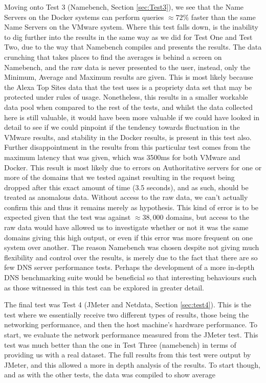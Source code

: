 Moving onto Test 3 (Namebench, Section \ref{sec:Test3}), we see that the Name Servers on the Docker systems can perform queries \(\approx72\%\) faster than the same Name Servers on the VMware system. Where this test falls down, is the inability to dig further into the results in the same way as we did for Test One and Test Two, due to the way that Namebench compiles and presents the results. The data crunching that takes places to find the averages is behind a screen on Namebench, and the raw data is never presented to the user, instead, only the Minimum, Average and Maximum results are given. This is most likely because the Alexa Top Sites data that the test uses is a propriety data set that may be protected under rules of usage. Nonetheless, this results in a smaller workable data pool when compared to the rest of the tests, and whilst the data collected here is still valuable, it would have been more valuable if we could have looked in detail to see if we could pinpoint if the tendency towards fluctuation in the VMware results, and stability in the Docker results, is present in this test also. Further disappointment in the results from this particular test comes from the maximum latency that was given, which was 3500ms for both VMware and Docker. This result is most likely due to errors on Authoritative servers for one or more of the domains that we tested against resulting in the request being dropped after this exact amount of time (3.5 seconds), and as such, should be treated as anomalous data. Without access to the raw data, we can't actually confirm this and thus it remains merely as hypothesis. This kind of error is to be expected given that the test was against \(\approx 38,000\) domains, but access to the raw data would have allowed us to investigate whether or not it was the same domains giving this high output, or even if this error was more frequent on one system over another. The reason Namebench was chosen despite not giving much flexibility and control over the results, is merely due to the fact that there are so few DNS server performance tests. Perhaps the development of a more in-depth DNS benchmarking suite would be beneficial so that interesting behaviours such as those witnessed in this test can be explored in greater detail.

The final test was Test 4 (JMeter and Netdata, Section \ref{sec:test4}). This is the test where we essentially receive two different types of results, those being the networking performance, and then the host machine's hardware performance. To start, we evaluate the network performance measured from the JMeter test. This test was much better than the one in Test Three (namebench) in terms of providing us with a real dataset. The full results from this test were output by JMeter, and this allowed a more in depth analysis of the results. To start though, and as with the other tests, the data was compiled to show average

